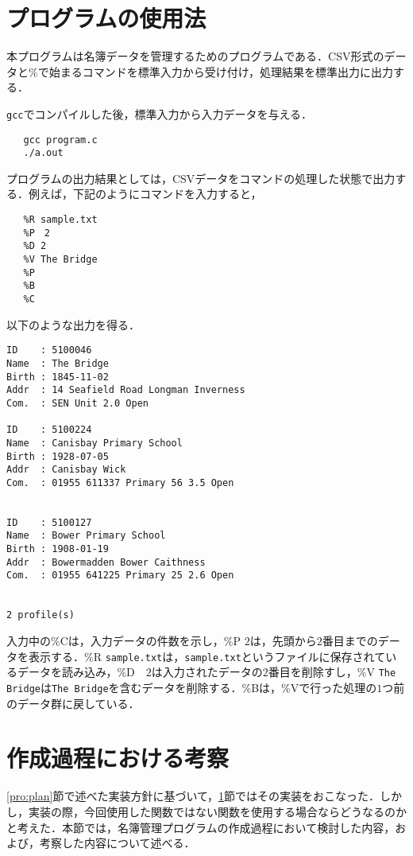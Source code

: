 \documentclass[a4j,11pt]{jarticle}
\begin{document}
\section{プログラムの使用法}\label{pro:do}
本プログラムは名簿データを管理するためのプログラムである．CSV形式のデータと\%で始まるコマンドを標準入力から受け付け，処理結果を標準出力に出力する．

\verb|gcc|でコンパイルした後，標準入力から入力データを与える．
{\fontsize{10pt}{11pt} \selectfont
 \begin{verbatim}
   gcc program.c
   ./a.out
 \end{verbatim}
}
プログラムの出力結果としては，CSVデータをコマンドの処理した状態で出力する．例えば，下記のようにコマンドを入力すると，
{\fontsize{8pt}{11pt} \selectfont
 \begin{verbatim}
   %R sample.txt
   %P　2
   %D 2
   %V The Bridge
   %P
   %B
   %C
 \end{verbatim}
}
\noindent 
以下のような出力を得る．
{\fontsize{10pt}{11pt} \selectfont
 \begin{verbatim}
ID    : 5100046
Name  : The Bridge
Birth : 1845-11-02
Addr  : 14 Seafield Road Longman Inverness
Com.  : SEN Unit 2.0 Open

ID    : 5100224
Name  : Canisbay Primary School
Birth : 1928-07-05
Addr  : Canisbay Wick
Com.  : 01955 611337 Primary 56 3.5 Open


ID    : 5100127
Name  : Bower Primary School
Birth : 1908-01-19
Addr  : Bowermadden Bower Caithness
Com.  : 01955 641225 Primary 25 2.6 Open


2 profile(s)
 \end{verbatim}
}
\noindent
入力中の\%Cは，入力データの件数を示し，\%P $2$は，先頭から$2$番目までのデータを表示する．\%R \verb|sample.txt|は，\verb|sample.txt|というファイルに保存されているデータを読み込み，\%D　$2$は入力されたデータの$2$番目を削除すし，\%V \verb|The Bridge|は\verb|The Bridge|を含むデータを削除する．\%Bは，\%Vで行った処理の$1$つ前のデータ群に戻している．


\section{作成過程における考察}
\ref{pro:plan}節で述べた実装方針に基づいて，\ref{pro:do}節ではその実装をおこなった．しかし，実装の際，今回使用した関数ではない関数を使用する場合ならどうなるのかと考えた．本節では，名簿管理プログラムの作成過程において検討した内容，および，考察した内容について述べる．
\end{document}
